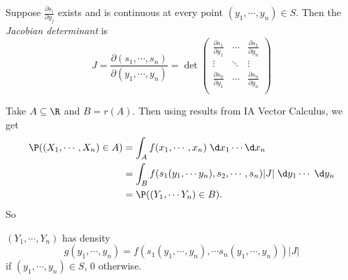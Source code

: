 \documentclass[a4paper]{article}
\begin{document}
\begin{defi}
  Suppose $\frac{\partial s_i}{\partial y_j}$ exists and is continuous at every point $(y_1, \cdots, y_n)\in S$. Then the \emph{Jacobian determinant} is
  \[
    J = \frac{\partial (s_1, \cdots, s_n)}{\partial (y_1, \cdots, y_n)} =
    \det
    \begin{pmatrix}
      \frac{\partial s_1}{\partial y_1} & \cdots & \frac{\partial s_1}{\partial y_n}\\
      \vdots & \ddots & \vdots\\
      \frac{\partial s_n}{\partial y_1} & \cdots & \frac{\partial s_n}{\partial y_n}\\
    \end{pmatrix}
  \]
\end{defi}
Take $A\subseteq \R$ and $B = r(A)$. Then using results from IA Vector Calculus, we get
\begin{align*}
  \P((X_1, \cdots, X_n)\in A) &= \int_A f(x_1, \cdots, x_n) \;\d x_1\cdots \d x_n\\
  &= \int_B f(s_1(y_1, \cdots y_n), s_2, \cdots, s_n) |J|\;\d y_1\cdots \;\d y_n\\
  &= \P((Y_1, \cdots Y_n)\in B).
\end{align*}
So
\begin{prop}
  $(Y_1, \cdots, Y_n)$ has density
  \[
    g(y_1, \cdots, y_n) = f(s_1(y_1, \cdots, y_n), \cdots s_n(y_1, \cdots, y_n))|J|
  \]
  if $(y_1, \cdots, y_n)\in S$, $0$ otherwise.
\end{prop}
\end{document}
